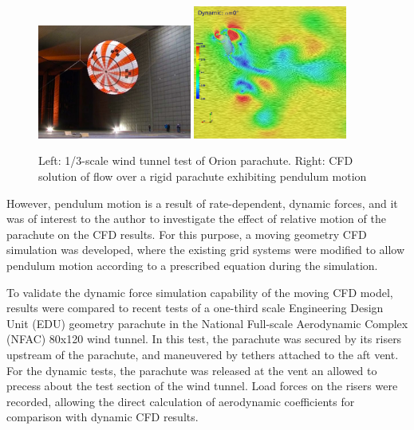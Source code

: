 \documentclass[]{aiaa-tc}%
\begin{document}
\begin{figure}[htb!]
\begin{center}
\includegraphics[width=0.45\textwidth]{Images/NFAC_OrionChute.jpg}
\includegraphics[width=0.45\textwidth]{Images/FlowVizDynamic.png}
\caption{Left: 1/3-scale wind tunnel test of Orion parachute.  Right: CFD solution of flow over a rigid parachute exhibiting pendulum motion}
\label{WTTandCFD}
\end{center}
\end{figure}
\vspace{-2em}


However, pendulum motion is a result of rate-dependent, dynamic forces, and it was of interest to the author to investigate the effect of relative motion of the parachute on the CFD results.  For this purpose, a moving geometry CFD simulation was developed, where the existing grid systems were modified to allow pendulum motion according to a prescribed equation during the simulation.

To validate the dynamic force simulation capability of the moving CFD model, results were compared to recent tests of a one-third scale Engineering Design Unit (EDU) geometry parachute in the National Full-scale Aerodynamic Complex (NFAC) 80x120 wind tunnel.  In this test, the parachute was secured by its risers upstream of the parachute, and maneuvered by tethers attached to the aft vent.  For the dynamic tests, the parachute was released at the vent an allowed to precess about the test section of the wind tunnel.  Load forces on the risers were recorded, allowing the direct calculation of aerodynamic coefficients for comparison with dynamic CFD results.\cite{blockage}
\end{document}
